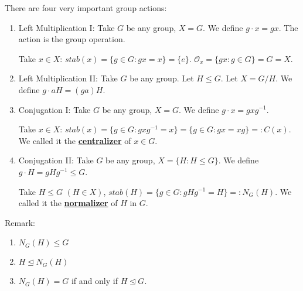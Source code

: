 \documentclass[twoside]{article}
\begin{document}
There are four very important group actions: \begin{enumerate}
	\item Left Multiplication I: Take $G$ be any group, $X = G$. We define $g \cdot x = gx$. The action is the group operation.

	      Take $x \in X$: $stab(x) = \{g \in G : gx = x\} = \{e\}$. $\mathcal{O}_x = \{gx : g \in G\} = G = X$.
	\item Left Multiplication II: Take $G$ be any group. Let $H \leq G$. Let $X = G / H$. We define $g \cdot aH = (ga)H$.

	\item Conjugation I: Take $G$ be any group, $X = G$. We define $g \cdot x = gxg^{-1}$.

	      Take $x \in X$: $stab(x) = \{g \in G: gxg^{-1} = x\} = \{g\in G : gx = xg\} =: C(x)$. We called it the \textbf{\underline{centralizer}} of $x \in G$.

	\item Conjugation II: Take $G$ be any group, $X = \{H : H \leq G\}$. We define $g \cdot H = gHg^{-1} \leq G$.

	      Take $H \leq G$ $(H \in X)$, $stab(H) = \{g \in G : gHg^{-1} = H\} =: N_G(H)$. We called it the \textbf{\underline{normalizer}} of $H$ in $G$.
\end{enumerate}

Remark: \begin{enumerate}
	\item $N_G(H) \leq G$
	\item $H \trianglelefteq N_G(H)$
	\item $N_G(H) = G$ if and only if $H \trianglelefteq G$.
\end{enumerate}
\end{document}
